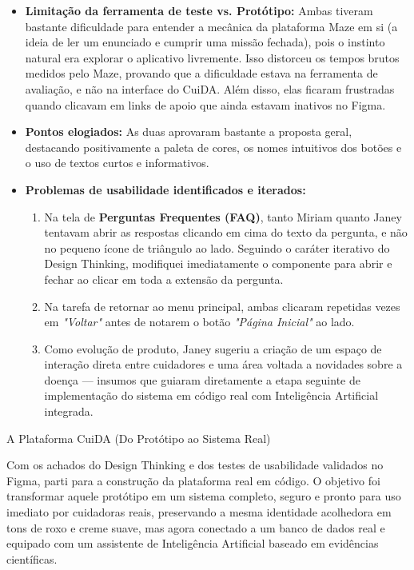 \documentclass[11pt,a4paper]{article}
\newcommand{\tituloSecao}[1]{%
  \par\addvspace{12pt}%
  {\noindent\fontsize{20pt}{24pt}\selectfont\normalfont\color{headingBlue}#1\par}%
  \vspace{4pt}%
}
\begin{document}
\begin{itemize}[leftmargin=1.25cm, label=\textbullet, topsep=2pt, itemsep=6pt]
  \item \textbf{Limitação da ferramenta de teste vs. Protótipo:} Ambas tiveram bastante dificuldade para entender a mecânica da plataforma Maze em si (a ideia de ler um enunciado e cumprir uma missão fechada), pois o instinto natural era explorar o aplicativo livremente. Isso distorceu os tempos brutos medidos pelo Maze, provando que a dificuldade estava na ferramenta de avaliação, e não na interface do CuiDA. Além disso, elas ficaram frustradas quando clicavam em links de apoio que ainda estavam inativos no Figma.
  \item \textbf{Pontos elogiados:} As duas aprovaram bastante a proposta geral, destacando positivamente a paleta de cores, os nomes intuitivos dos botões e o uso de textos curtos e informativos.
  \item \textbf{Problemas de usabilidade identificados e iterados:}
    \begin{enumerate}[leftmargin=0.8cm, topsep=4pt, itemsep=4pt]
      \item Na tela de \textbf{Perguntas Frequentes (FAQ)}, tanto Miriam quanto Janey tentavam abrir as respostas clicando em cima do texto da pergunta, e não no pequeno ícone de triângulo ao lado. Seguindo o caráter iterativo do Design Thinking, modifiquei imediatamente o componente para abrir e fechar ao clicar em toda a extensão da pergunta.
      \item Na tarefa de retornar ao menu principal, ambas clicaram repetidas vezes em \textit{"Voltar"} antes de notarem o botão \textit{"Página Inicial"} ao lado.
      \item Como evolução de produto, Janey sugeriu a criação de um espaço de interação direta entre cuidadores e uma área voltada a novidades sobre a doença — insumos que guiaram diretamente a etapa seguinte de implementação do sistema em código real com Inteligência Artificial integrada.
    \end{enumerate}
\end{itemize}


\tituloSecao{A Plataforma CuiDA (Do Protótipo ao Sistema Real)}

Com os achados do Design Thinking e dos testes de usabilidade validados no Figma, parti para a construção da plataforma real em código. O objetivo foi transformar aquele protótipo em um sistema completo, seguro e pronto para uso imediato por cuidadoras reais, preservando a mesma identidade acolhedora em tons de roxo e creme suave, mas agora conectado a um banco de dados real e equipado com um assistente de Inteligência Artificial baseado em evidências científicas.
\end{document}
